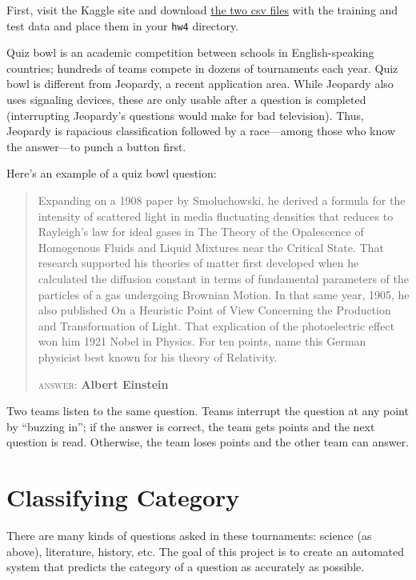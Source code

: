 \documentclass[11pt]{article}
\begin{document}
First, visit the Kaggle site and download \href{https://inclass.kaggle.com/c/cmsc-5832-classification/data}{the two csv files} with the training and test data and place them in your \texttt{hw4} directory.

Quiz bowl is an academic competition between schools in English-speaking countries; hundreds of teams compete in dozens of tournaments each year. Quiz bowl is different from Jeopardy, a recent application area. While Jeopardy also uses signaling devices, these are only usable after a question is completed (interrupting Jeopardy's questions would make for bad television). Thus, Jeopardy is rapacious classification followed by a race---among those who know the answer---to punch a button first.

Here's an example of a quiz bowl question:

\begin{quote}
Expanding on a 1908 paper by Smoluchowski, he derived a formula for the intensity of scattered light in media fluctuating densities that reduces to Rayleigh's law for ideal gases in The Theory of the Opalescence of Homogenous Fluids and Liquid Mixtures near the Critical State. That research supported his theories of matter first developed when he calculated the diffusion constant in terms of fundamental parameters of the particles of a gas undergoing Brownian Motion. In that same year, 1905, he also published On a Heuristic Point of View Concerning the Production and Transformation of Light. That explication of the photoelectric effect won him 1921 Nobel in Physics. For ten points, name this German physicist best known for his theory of Relativity.

\textsc{answer}: {\bf Albert Einstein}
\end{quote}

Two teams listen to the same question. Teams interrupt the question at any point by ``buzzing in''; if the answer is correct, the team gets points and the next question is read. Otherwise, the team loses points and the other team can answer.

\section*{Classifying Category}

There are many kinds of questions asked in these tournaments: science (as above), literature, history, etc.  The goal of this project is to create an automated system that predicts the category of a question as accurately as possible.
\end{document}
